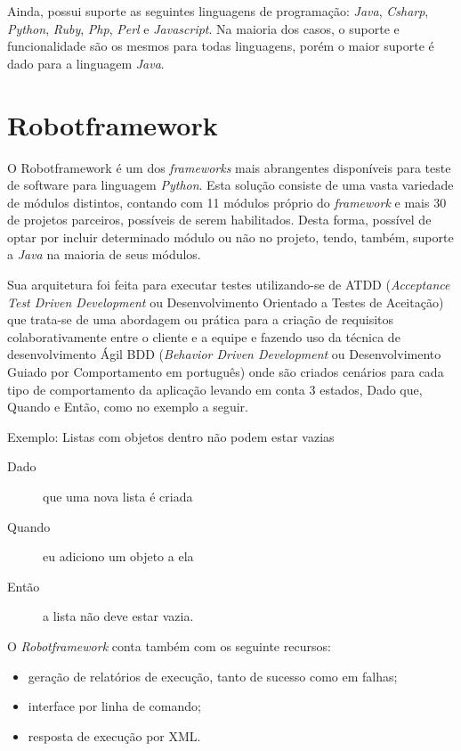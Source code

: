         Ainda, possui suporte as seguintes linguagens de programação: \textit{Java}, \textit{Csharp}, \textit{Python}, \textit{Ruby}, \textit{Php}, \textit{Perl} e \textit{Javascript}. Na maioria
        dos casos, o suporte e funcionalidade são os mesmos para todas linguagens, porém o maior suporte é dado para a linguagem \textit{Java}.


    \section{Robotframework}

        O Robotframework \cite{robotframework} é um dos \textit{frameworks} mais abrangentes disponíveis para teste de software para linguagem \textit{Python}. Esta solução consiste
        de uma vasta variedade de módulos distintos, contando com 11 módulos próprio do \textit{framework} e mais 30 de projetos parceiros, possíveis de serem habilitados. Desta forma,
        possível de optar por incluir determinado módulo ou não no projeto, tendo, também, suporte a \textit{Java} na maioria de seus módulos.

        Sua arquitetura foi feita para executar testes utilizando-se de ATDD (\textit{Acceptance Test Driven Development} ou Desenvolvimento Orientado a Testes de Aceitação) que trata-se de uma
        abordagem ou prática para a criação de requisitos colaborativamente entre o cliente e a equipe e fazendo uso da técnica de desenvolvimento Ágil BDD
        (\textit{Behavior Driven Development} ou Desenvolvimento Guiado por Comportamento em português) onde são criados cenários para cada tipo de comportamento da aplicação levando em
        conta 3 estados, Dado que, Quando e Então, como no exemplo a seguir.

        \vspace*{0,5cm}
        Exemplo: Listas com objetos dentro não podem estar vazias
        \begin{description}
            \item[Dado] que uma nova lista é criada
            \item[Quando] eu adiciono um objeto a ela
            \item[Então] a lista não deve estar vazia.
        \end{description}
        \vspace*{0,5cm}

        O \textit{Robotframework} conta também com os seguinte recursos:
        \begin{itemize}
            \item geração de relatórios de execução, tanto de sucesso como em falhas;
            \item interface por linha de comando;
            \item resposta de execução por XML.
        \end{itemize}


